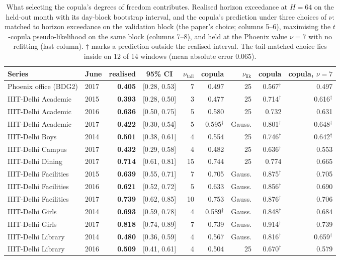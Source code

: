 \begin{table}[t]
\centering
\scriptsize
\setlength{\tabcolsep}{3pt}
\begin{tabular}{llrcrrrrr}
\toprule
Series & June & realised & 95\% CI & $\nu_{\mathrm{tail}}$ & copula & $\nu_{\mathrm{lik}}$ & copula & copula, $\nu{=}7$ \\
\midrule
Phoenix office (BDG2) & 2017 & \textbf{0.405} & [0.28, 0.53] & 7 & 0.497 & 25 & 0.567$^\dagger$ & 0.497 \\
\midrule
IIIT-Delhi Academic & 2015 & \textbf{0.393} & [0.28, 0.50] & 3 & 0.477 & 25 & 0.714$^\dagger$ & 0.616$^\dagger$ \\
IIIT-Delhi Academic & 2016 & \textbf{0.636} & [0.50, 0.75] & 5 & 0.580 & 25 & 0.732 & 0.631 \\
IIIT-Delhi Academic & 2017 & \textbf{0.422} & [0.30, 0.54] & 5 & 0.595$^\dagger$ & Gauss. & 0.801$^\dagger$ & 0.648$^\dagger$ \\
IIIT-Delhi Boys & 2014 & \textbf{0.501} & [0.38, 0.61] & 4 & 0.554 & 25 & 0.746$^\dagger$ & 0.642$^\dagger$ \\
IIIT-Delhi Campus & 2017 & \textbf{0.432} & [0.29, 0.58] & 4 & 0.482 & 25 & 0.636$^\dagger$ & 0.553 \\
IIIT-Delhi Dining & 2017 & \textbf{0.714} & [0.61, 0.81] & 15 & 0.744 & 25 & 0.774 & 0.665 \\
IIIT-Delhi Facilities & 2015 & \textbf{0.639} & [0.55, 0.71] & 7 & 0.705 & Gauss. & 0.875$^\dagger$ & 0.705 \\
IIIT-Delhi Facilities & 2016 & \textbf{0.621} & [0.52, 0.72] & 5 & 0.633 & Gauss. & 0.856$^\dagger$ & 0.690 \\
IIIT-Delhi Facilities & 2017 & \textbf{0.739} & [0.62, 0.85] & 10 & 0.753 & Gauss. & 0.876$^\dagger$ & 0.706 \\
IIIT-Delhi Girls & 2014 & \textbf{0.693} & [0.59, 0.78] & 4 & 0.589$^\dagger$ & Gauss. & 0.848$^\dagger$ & 0.684 \\
IIIT-Delhi Girls & 2017 & \textbf{0.818} & [0.74, 0.89] & 7 & 0.739 & Gauss. & 0.914$^\dagger$ & 0.739 \\
IIIT-Delhi Library & 2014 & \textbf{0.480} & [0.36, 0.59] & 4 & 0.567 & Gauss. & 0.816$^\dagger$ & 0.659$^\dagger$ \\
IIIT-Delhi Library & 2016 & \textbf{0.509} & [0.41, 0.61] & 4 & 0.504 & 25 & 0.670$^\dagger$ & 0.579 \\
\bottomrule
\end{tabular}
\caption{What selecting the copula's degrees of freedom contributes. Realised horizon exceedance at $H=64$ on the held-out month with its day-block bootstrap interval, and the copula's prediction under three choices of $\nu$: matched to horizon exceedance on the validation block (the paper's choice; columns 5--6), maximising the $t$-copula pseudo-likelihood on the same block (columns 7--8), and held at the Phoenix value $\nu=7$ with no refitting (last column). $\dagger$ marks a prediction outside the realised interval. The tail-matched choice lies inside on 12 of 14 windows (mean absolute error $0.065$).}
\label{tab:copula-df}
\end{table}

